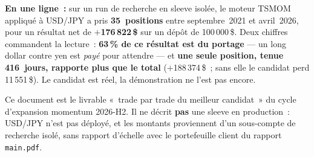 \documentclass[11pt, a4paper]{scrartcl}
\begin{document}
\vspace{0.8cm}

\begin{thesisbox}
\textbf{En une ligne~:} sur un run de recherche en sleeve isolée, le moteur
TSMOM appliqué à USD/JPY a pris \textbf{35~positions} entre septembre~2021 et
avril~2026, pour un résultat net de \textbf{$+$176\,822\,\$} sur un dépôt de
100\,000\,\$. Deux chiffres commandent la lecture~: \textbf{63\,\% de ce
résultat est du portage} --- un long dollar contre yen est \emph{payé} pour
attendre --- et \textbf{une seule position, tenue 416~jours, rapporte plus que
le total} ($+$188\,374\,\$~; sans elle le candidat perd 11\,551\,\$). Le
candidat est réel, la démonstration ne l'est pas encore.
\end{thesisbox}

\vspace{0.4cm}

{\small\color{slateGrey}\sffamily
Ce document est le livrable «~trade par trade du meilleur candidat~» du cycle
d'expansion momentum 2026-H2. Il ne décrit \textbf{pas} une sleeve en
production~: USD/JPY n'est pas déployé, et les montants proviennent d'un
sous-compte de recherche isolé, sans rapport d'échelle avec le portefeuille
client du rapport \texttt{main.pdf}.}

\clearpage

\tableofcontents
\clearpage










\end{document}
